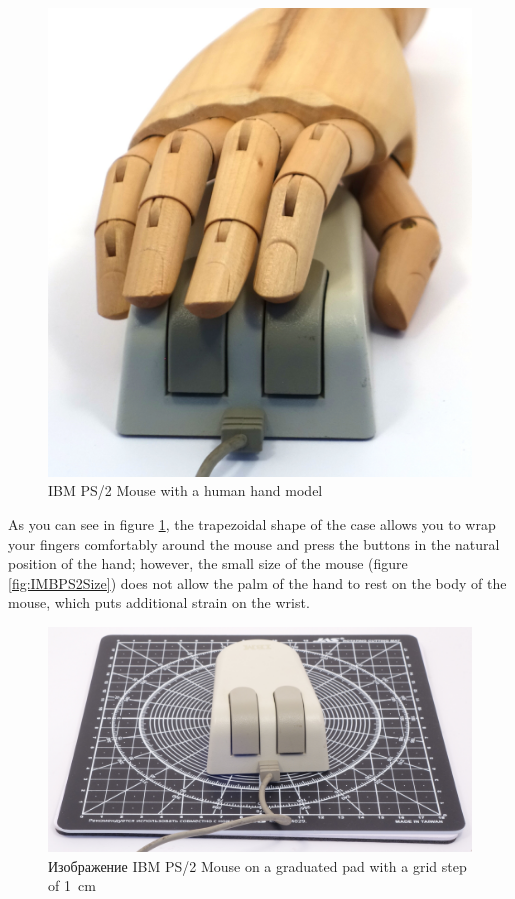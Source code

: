 \documentclass[11pt, a4paper]{article}
\begin{document}
\begin{figure}[h]
    \centering
    \includegraphics[scale=0.4]{1987_ibm_ps2_mouse/num3.JPG}
    \caption{IBM PS/2 Mouse with a human hand model}
    \label{fig:IMBPS2Hand}
\end{figure}

As you can see in figure \ref{fig:IMBPS2Hand}, the trapezoidal shape of the case allows you to wrap your fingers comfortably around the mouse and press the buttons in the natural position of the hand; however, the small size of the mouse (figure \ref{fig:IMBPS2Size}) does not allow the palm of the hand to rest on the body of the mouse, which puts additional strain on the wrist.

\begin{figure}[h]
    \centering
    \includegraphics[scale=0.34]{1987_ibm_ps2_mouse/num4.jpg}
    \caption{Изображение IBM PS/2 Mouse on a graduated pad with a grid step of 1~cm}
    \label{fig:IBMPS2Size}
\end{figure}
\end{document}
